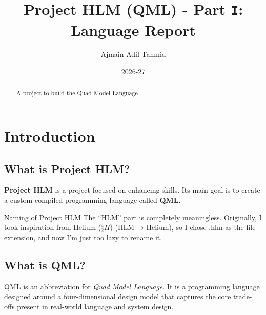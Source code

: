 \documentclass[12pt]{report}
\title{Project HLM (QML) - Part \textbf{\texttt{I}}: Language Report}
\author{Ajmain Adil Tahmid}
\date{2026-27}
\newcommand{\funfact}[2]{\begin{funfactbox}{#1} #2 \end{funfactbox}}
\begin{document}
	
	\maketitle
	
	\begin{abstract}
		\begin{center}
			A project to build the Quad Model Language
		\end{center}
	\end{abstract}
	
	\newpage
	
	\tableofcontents
	
	\newpage
	
	\chapter{Introduction}
	\label{sec:intro}
	\section{What is Project HLM?}
	\textbf{Project HLM} is a project focused on enhancing skills. Its main goal is to create a custom compiled programming language called \textbf{QML}.
	
	\vspace{1.5em}
	
	
	
	\begin{funfactbox}{Naming of Project HLM}
		The “HLM” part is completely meaningless. Originally, I took inspiration from Helium ($^4_2H$)  (HLM → Helium), so I chose .hlm as the file extension, and now I’m just too lazy to rename it.
	\end{funfactbox}
	
	\vspace{0.5em}
	
	\section{What is QML?}
	QML is an abbreviation for \textit{Quad Model Language}. It is a programming language designed around a four-dimensional design model that captures the core trade-offs present in real-world language and system design.
	
	\vspace{1.5em}
	
\end{document}
